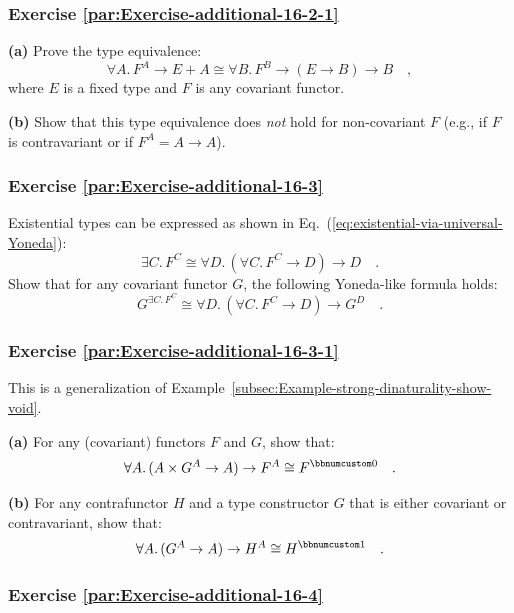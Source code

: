 \subsubsection{Exercise \label{par:Exercise-additional-16-2-1}\ref{par:Exercise-additional-16-2-1}}

\textbf{(a)} Prove the type equivalence:
\[
\forall A.\,F^{A}\rightarrow E+A\cong\forall B.\,F^{B}\rightarrow(E\rightarrow B)\rightarrow B\quad,
\]
where $E$ is a fixed type and $F$ is any covariant functor.

\textbf{(b)} Show that this type equivalence does \emph{not} hold
for non-covariant $F$ (e.g., if $F$ is contravariant or if $F^{A}=A\rightarrow A$).

\subsubsection{Exercise \label{par:Exercise-additional-16-3}\ref{par:Exercise-additional-16-3}}

Existential types can be expressed as shown in Eq.~(\ref{eq:existential-via-universal-Yoneda}):
\[
\exists C.\,F^{C}\cong\forall D.\,(\forall C.\,F^{C}\rightarrow D)\rightarrow D\quad.
\]
Show that for any covariant functor $G$, the following Yoneda-like
formula holds:
\[
G^{\exists C.\,F^{C}}\cong\forall D.\,(\forall C.\,F^{C}\rightarrow D)\rightarrow G^{D}\quad.
\]


\subsubsection{Exercise \label{par:Exercise-additional-16-3-1}\ref{par:Exercise-additional-16-3-1}}

This is a generalization of Example~\ref{subsec:Example-strong-dinaturality-show-void}.

\textbf{(a)} For any (covariant) functors $F$ and $G$, show that:
\[
\forall A.\,(A\times G^{A}\rightarrow A)\rightarrow F^{A}\cong F^{\bbnum 0}\quad.
\]

\textbf{(b)} For any contrafunctor $H$ and a type constructor $G$
that is either covariant or contravariant, show that:
\[
\forall A.\,(G^{A}\rightarrow A)\rightarrow H^{A}\cong H^{\bbnum 1}\quad.
\]


\subsubsection{Exercise \label{par:Exercise-additional-16-4}\ref{par:Exercise-additional-16-4}}

